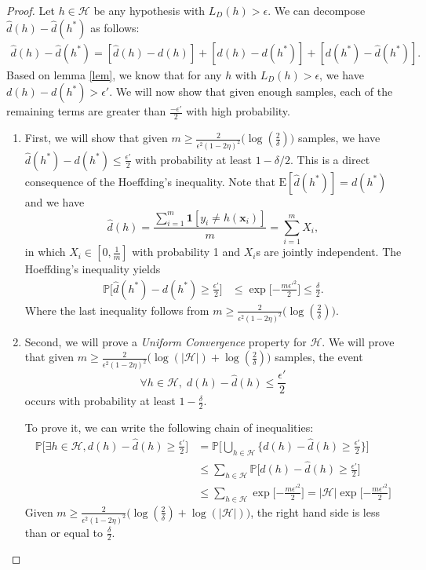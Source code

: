 \documentclass[]{article}
\newcommand{\bx}{\mathbf{x}}
\newcommand{\cH}{\mathcal{H}}
\begin{document}
	\begin{proof}
		Let $h\in\cH$ be any hypothesis with $L_D(h) > \epsilon$. We can decompose $\hat{d}(h) - \hat{d}(h^*)$ as follows:
		\begin{align}
		\label{decomp}
		\hat{d}(h) - \hat{d}(h^*) = [\hat{d}(h) - d(h)]+[d(h) - d(h^*)]+[d(h^*) - \hat{d}(h^*)].
		\end{align}
		Based on lemma \eqref{lem}, we know that for any $h$ with $L_D(h)>\epsilon$, we have $d(h)-d(h^*)> \epsilon'$.  We will now show that given enough samples, each of the remaining terms are greater than $\frac{-\epsilon'}{2}$ with high probability.
		
		\begin{enumerate}
			\item First, we will show that given $m\geq \frac{2}{\epsilon^2(1-2\eta)^2}\Big(\log(\frac{2}{\delta})\Big)$ samples, we have $\hat{d}(h^*) - d(h^*)  \leq \frac{\epsilon'}{2}$ with probability at least $1-\delta/2$. This is a direct consequence of the Hoeffding's inequality. Note that $\mathrm{E}[\hat{d}(h^*)] = d(h^*)$ and we have 
			\begin{equation}
			\hat{d}(h) = \frac{\sum_{i = 1}^{m} \mathbf{1}[y_i \neq h(\bx_i) ]}{m} = \sum_{i = 1}^{m} X_i,
			\end{equation}
			in which $X_i \in [0, \frac{1}{m}]$ with probability 1 and $X_i$s are jointly independent. The Hoeffding's inequality yields
			\begin{align}
			\mathbb{P}\big[\hat{d}(h^*) - d(h^*) \geq \frac{\epsilon'}{2}\big] &\leq \exp\Big[{-\frac{m\epsilon'^2}{2}}\Big] \leq \frac{\delta}{2}.
			\end{align}
			Where the last inequality follows from $m\geq \frac{2}{\epsilon^2(1-2\eta)^2}\Big(\log(\frac{2}{\delta})\Big)$.
			\item Second, we will prove a \textit{Uniform Convergence} property for $\cH$. We will prove that given $m\geq \frac{2}{\epsilon^2(1-2\eta)^2}\Big(\log(|\cH|) +  \log(\frac{2}{\delta})\Big)$ samples, the event
			\begin{equation}
			\forall h\in \cH,\; d(h) - \hat{d}(h) \leq \frac{\epsilon'}{2}
			\end{equation}
			occurs with probability at least  $1-\frac{\delta}{2}$. 
			
			To prove it, we can write the following chain of inequalities:
			\begin{align}
			\mathbb{P}\Big[\exists h\in \cH, d(h) - \hat{d}(h) \geq \frac{\epsilon'}{2}\Big] &= \mathbb{P}\Big[\bigcup_{h\in\cH} \big\{d(h) - \hat{d}(h) \geq \frac{\epsilon'}{2}\big\}\Big]\\
			&\leq \sum_{h \in \cH}\mathbb{P}\Big[d(h) - \hat{d}(h) \geq \frac{\epsilon'}{2}\Big]\\
			&\leq \sum_{h \in \cH} \exp\Big[{-\frac{m\epsilon'^2}{2}}\Big] = |\cH|\exp\Big[{-\frac{m\epsilon'^2}{2}}\Big]
			\end{align}
			Given $m\geq \frac{2}{\epsilon^2(1-2\eta)^2}\Big(\log(\frac{2}{\delta})+\log(|\cH|)\Big)$, the right hand side is less than or equal to $\frac{\delta}{2}$.
		\end{enumerate}
		

\end{proof}
\end{document}
